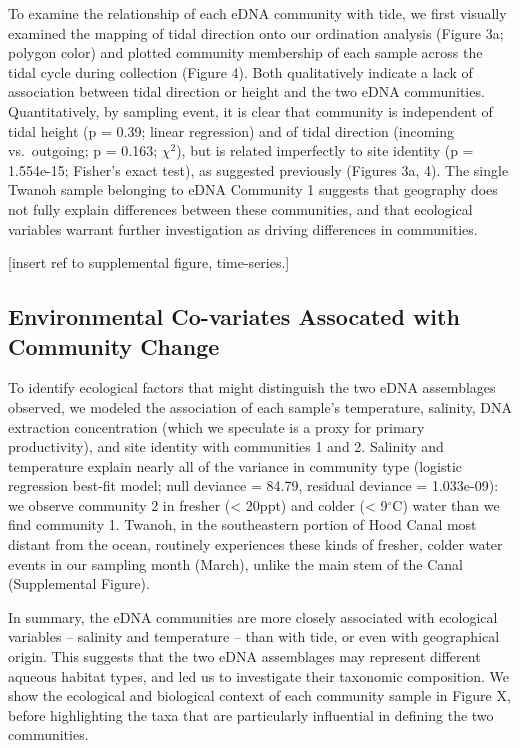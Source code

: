 \documentclass[fleqn,10pt,lineno]{wlpeerj} %
\begin{document}
To examine the relationship of each eDNA community with tide, we first
visually examined the mapping of tidal direction onto our ordination
analysis (Figure 3a; polygon color) and plotted community membership of
each sample across the tidal cycle during collection (Figure 4). Both
qualitatively indicate a lack of association between tidal direction or
height and the two eDNA communities. Quantitatively, by sampling event,
it is clear that community is independent of tidal height (p = 0.39;
linear regression) and of tidal direction (incoming vs.~outgoing; p =
0.163; \(\chi^2\)), but is related imperfectly to site identity (p =
1.554e-15; Fisher's exact test), as suggested previously (Figures 3a,
4). The single Twanoh sample belonging to eDNA Community 1 suggests that
geography does not fully explain differences between these communities,
and that ecological variables warrant further investigation as driving
differences in communities.

{[}insert ref to supplemental figure, time-series.{]}

\subsection{Environmental Co-variates Assocated with Community
Change}\label{environmental-co-variates-assocated-with-community-change}

To identify ecological factors that might distinguish the two eDNA
assemblages observed, we modeled the association of each sample's
temperature, salinity, DNA extraction concentration (which we speculate
is a proxy for primary productivity), and site identity with communities
1 and 2. Salinity and temperature explain nearly all of the variance in
community type (logistic regression best-fit model; null deviance =
84.79, residual deviance = 1.033e-09): we observe community 2 in fresher
(\textless{} 20ppt) and colder (\textless{} 9\(^\circ\)C) water than we
find community 1. Twanoh, in the southeastern portion of Hood Canal most
distant from the ocean, routinely experiences these kinds of fresher,
colder water events in our sampling month (March), unlike the main stem
of the Canal (Supplemental Figure).

In summary, the eDNA communities are more closely associated with
ecological variables -- salinity and temperature -- than with tide, or
even with geographical origin. This suggests that the two eDNA
assemblages may represent different aqueous habitat types, and led us to
investigate their taxonomic composition. We show the ecological and
biological context of each community sample in Figure X, before
highlighting the taxa that are particularly influential in defining the
two communities.
\end{document}
